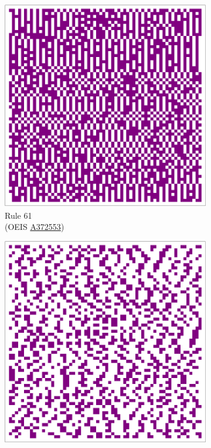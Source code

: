 \documentclass{article}
\begin{document}
\begin{figure}[H]
\begin{subfigure}[b]{0.24\textwidth}
        \includegraphics[width=.9\textwidth]{graphics/behavior/center-columns/rule-61-center_column_plot-4096.pdf}
        \caption*{Rule 61\\(OEIS \href{https://oeis.org/A372553}{A372553})}
        \label{fig:rule-61-center_column_plot-4096}
    \end{subfigure}
    \begin{subfigure}[b]{0.24\textwidth}
        \centering
        \includegraphics[width=.9\textwidth]{graphics/behavior/center-columns/rule-62-center_column_plot-4096.pdf}

\end{subfigure}
\end{figure}
\end{document}
